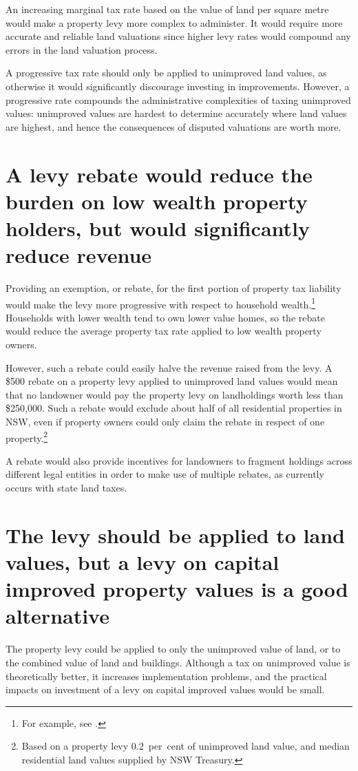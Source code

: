 \documentclass[twoside,english]{palatinob5ona4portrait}
\begin{document}
An increasing marginal tax rate based on the value of land per square metre would make a property levy more complex to administer. It would require more accurate and reliable land valuations since higher levy rates would compound any errors in the land valuation process. 

A progressive tax rate should only be applied to unimproved land values, as otherwise it would significantly discourage investing in improvements. However, a progressive rate compounds the administrative complexities of taxing unimproved values: unimproved values are hardest to determine accurately where land values are highest, and hence the consequences of disputed valuations are worth more.

\section{\label{sec:PROP-6-2}A levy rebate would reduce the burden on low wealth property holders, but would significantly reduce revenue}
Providing an exemption, or rebate, for the first portion of property tax liability would make the levy more progressive with respect to household wealth.\footnote{For example, see \textcite[][8]{SlackBird2014}.}  Households with lower wealth tend to own lower value homes, so the rebate would reduce the average property tax rate applied to low wealth property owners.  \enlargethispage{0.5\baselineskip}

However, such a rebate could easily halve the revenue raised from the levy. A \$500 rebate on a property levy applied to unimproved land values would mean that no landowner would pay the property levy on landholdings worth less than \$250,000. Such a rebate would exclude about half of all residential properties in NSW, even if property owners could only claim the rebate in respect of one property.\footnote{Based on a property levy 0.2~per~cent of unimproved land value, and median residential land values supplied by NSW Treasury.}

A rebate would also provide incentives for landowners to fragment holdings across different legal entities in order to make use of multiple rebates, as currently occurs with state land taxes.

\section{\label{sec:PROP-6-3}The levy should be applied to land values, but a levy on capital improved property values is a good alternative}
The property levy could be applied to only the unimproved value of land, or to the combined value of land and buildings. Although a tax on unimproved value is theoretically better, it increases implementation problems, and the practical impacts on investment of a levy on capital improved values would be small. \enlargethispage{0.5\baselineskip}
\end{document}
